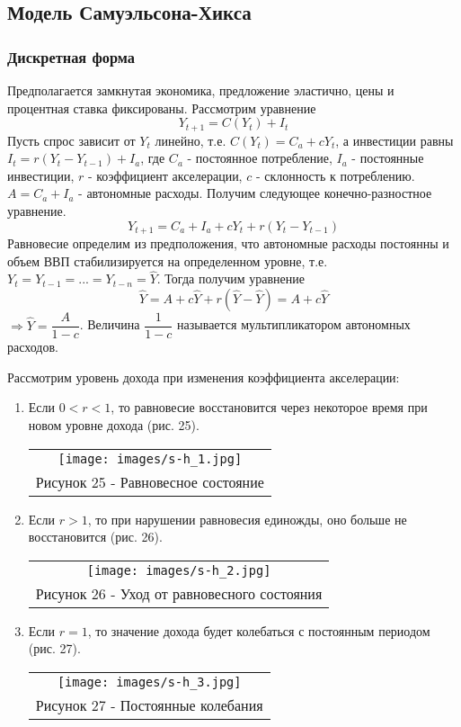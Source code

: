 \subsection{Модель Самуэльсона-Хикса}
\subsubsection{Дискретная форма}
Предполагается замкнутая экономика, предложение эластично, цены и процентная ставка фиксированы.
Рассмотрим уравнение
\begin{equation}
  Y_{t+1}=C(Y_t)+I_t
\end{equation}
Пусть спрос зависит от $Y_t$ линейно, т.е. $C(Y_t)=C_a+cY_t$, а инвестиции равны $I_t=r(Y_t-Y_{t-1}) +I_a$, где
$C_a$ - постоянное потребление, $I_a$ - постоянные инвестиции, $r$ - коэффициент акселерации, $c$ - склонность к потреблению.
 $A=C_a+I_a$ - автономные расходы. Получим следующее конечно-разностное уравнение.
 \begin{equation}
   Y_{t+1}=C_a+I_a + cY_t + r(Y_t-Y_{t-1})
 \end{equation}
 Равновесие определим из предположения, что автономные расходы постоянны и объем ВВП стабилизируется на определенном уровне, т.е.
 $Y_t=Y_{t-1}=...=Y_{t-n}=\widehat{Y}$. Тогда получим уравнение
 \begin{equation}
   \widehat{Y}=A + c\widehat{Y} + r(\widehat{Y}-\widehat{Y})=A+c\widehat{Y}
 \end{equation}
 $\Rightarrow \widehat{Y}=\dfrac{A}{1-c}$. Величина $\dfrac{1}{1-c}$ называется мультипликатором автономных расходов.

Рассмотрим уровень дохода при изменения коэффициента акселерации:
\begin{enumerate}


\item Если $0<r<1$, то равновесие восстановится через некоторое время при новом уровне дохода (рис. 25).
\begin{center}
  \begin{tabular}{c}
    \texttt{[image: images/s-h\_1.jpg]}\\
    Рисунок 25 - Равновесное состояние
  \end{tabular}
\end{center}
\item Если $r>1$, то при нарушении равновесия единожды, оно больше не восстановится (рис. 26).
\begin{center}
  \begin{tabular}{c}
    \texttt{[image: images/s-h\_2.jpg]}\\
    Рисунок 26 - Уход от равновесного состояния
  \end{tabular}
\end{center}
\item Если $r=1$, то значение дохода будет колебаться с постоянным периодом (рис. 27).
\begin{center}
  \begin{tabular}{c}
    \texttt{[image: images/s-h\_3.jpg]}\\
    Рисунок 27 - Постоянные колебания
  \end{tabular}
\end{center}
\end{enumerate}
